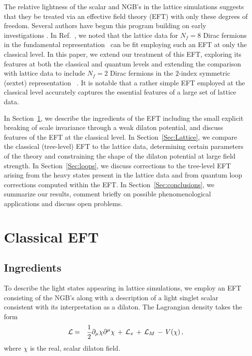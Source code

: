 \documentclass[a4paper,11pt]{article}
\newcommand{\beqs}{\begin{eqnarray}}
\newcommand{\eeqs}{\end{eqnarray}}
\begin{document}
The relative lightness of the scalar and NGB's in the lattice simulations suggests that they be treated via an effective field theory (EFT) with only these degrees of freedom. Several authors have begun this program \cite{EFTDilaton1,EFTDilaton2,EFTDilaton3,EFTDilaton4} building on early investigations \cite{C,LLB}. In Ref.~\cite{AIP}, we noted that the lattice data for $N_f = 8$ Dirac fermions in the fundamental representation~\cite{LSD,LatKMI,LatKMI2} can be fit employing such an EFT at only the classical level. In this paper, we extend our treatment of this EFT, exploring its features at both the classical and quantum levels and extending the comparison with lattice data to include $N_f = 2$ Dirac fermions in the $2$-index symmetric (sextet) representation ~\cite{FHKNSW,FHKMNW,FHKMNW2}. It is notable that a rather simple EFT employed at the classical level accurately captures the essential features of a large set of lattice data.

In Section~\ref{Sec:EFT}, we describe the ingredients of the EFT including the small explicit breaking of scale invariance through a weak dilaton potential, and discuss features of the EFT at the classical level. In Section~\ref{Sec:Lattice}, we compare the classical (tree-level) EFT to the lattice data, determining certain parameters of the theory and constraining the shape of the dilaton potential at large field strength. In Section~\ref{Sec:loops}, we discuss corrections to the tree-level EFT arising from the heavy states present in the lattice data and from quantum loop corrections computed within the EFT. In Section~\ref{Sec:conclusions}, we summarize our results, comment briefly on possible phenomenological applications and discuss open problems.



\section{Classical EFT}
\label{Sec:EFT}

\subsection{Ingredients}

To describe the light states appearing in lattice simulations, we employ an EFT consisting of the NGB's along with a description of a light singlet scalar consistent with its interpretation as a dilaton. The Lagrangian density takes the form 
\beqs 
{\cal L}&=&\frac{1}{2}\partial_{\mu} \chi \partial^{\mu} \chi \,+\,{\cal L}_{\pi} \, +\,{\cal L}_M  \,-\,V(\chi) \, , 
\label{Eq:L} 
\eeqs 
where $\chi$ is the real, scalar dilaton field. 
\end{document}
